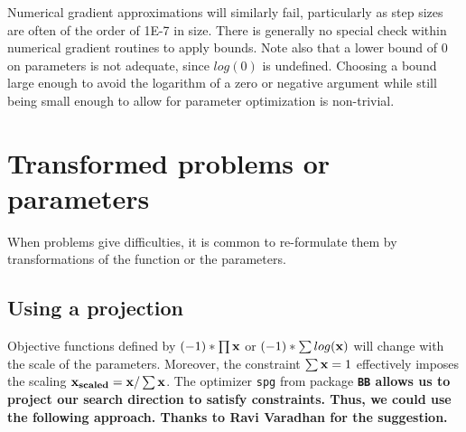 \documentclass[11pt]{article}
\newcommand{\B}[1]{{\bf #1 \rm}}
\newcommand{\code}[1]{{\tt#1}}
\newcommand{\pkg}[1]{\bf{\tt#1}\rm }
\begin{document}
Numerical gradient approximations will similarly fail, 
particularly as step sizes are often of the order
of 1E-7 in size. There is generally no special check within numerical 
gradient routines to apply bounds. 
Note also that a lower bound of 0 on parameters is not adequate, 
since $log(0)$ is undefined. Choosing a
bound large enough to avoid the logarithm of a zero or negative argument 
while still being small enough 
to allow for parameter optimization is non-trivial.



\section{Transformed problems or parameters}

When problems give difficulties, it is common to re-formulate them by transformations of the function
or the parameters. 

\subsection{Using a projection}

Objective functions defined by $(-1)*\prod{\B{x}}$ or $(-1)*\sum{log(\B{x})}$ will change 
with the scale of the parameters. Moreover, the constraint $\sum{\B{x}}=1$ 
effectively imposes the scaling $\B{x_{scaled}} = \B{x}/\sum{\B{x}}$. The 
optimizer \code{spg} from package \pkg{BB} allows us to project our search 
direction to satisfy constraints. Thus, we could use the following approach. Thanks
to Ravi Varadhan for the suggestion.
\end{document}
